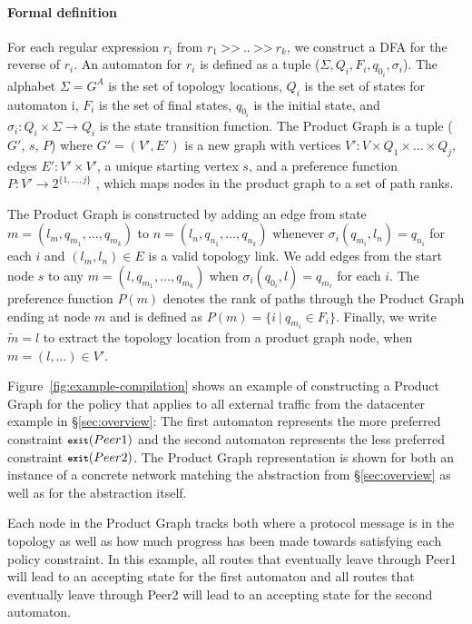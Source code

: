\documentclass{sig-alternate-10pt}
\newcommand{\para}[1]{\paragraph*{\textbf{#1}}}
\newcommand{\set}[1]{\ensuremath{\{ #1 \} }}
\newcommand{\CD}[1]{\texttt{\small #1}}  %
\newcommand{\KW}[1]{\texttt{\small\bfseries{#1}}}
\newcommand{\True}{\CD{true}}
\newcommand{\Prefer}{\texttt{>>}}
\newcommand{\Path}{\texttt{=>}}
\newcommand{\Exit}{\KW{exit}}
\begin{document}
\para{Formal definition}

For each regular expression $r_i$ from $r_1 ~\Prefer~ .. ~\Prefer~ r_k$, we construct a DFA for the reverse of $r_i$. An automaton for $r_i$ is defined as a tuple ($\Sigma, Q_i, F_i, q_{0_i}, \sigma_i$). The alphabet $\Sigma = G^A$ is the set of topology locations, $Q_i$ is the set of states for automaton i, $F_i$ is the set of final states, $q_{0_i}$ is the initial state, and $\sigma_i \colon Q_i \times \Sigma \rightarrow Q_i$ is the state transition function.
%
The Product Graph is a tuple ($G'$, $s$, $P$) where $G' = (V',E')$ is a new graph with 
vertices $V' \colon V \times Q_1 \times \dots \times Q_j$,
edges $E' \colon V' \times V'$,
a unique starting vertex $s$,
and a preference function $P \colon V' \rightarrow 2^{\set{1, \dots, j}}$ , which maps nodes in the product graph to a set of path ranks.

The Product Graph is constructed by adding an edge from state $m = (l_m, q_{m_1}, \dots, q_{m_k})$ to $n = (l_n, q_{n_1}, \dots, q_{n_k})$ whenever $\sigma_i(q_{m_i}, l_n) = q_{n_i}$ for each $i$ and $(l_m,l_n) \in E$ is a valid topology link.
%
We add edges from the start node $s$ to any $m = (l, q_{m_1}, \dots, q_{m_k})$ when $\sigma_i(q_{0_i}, l) = q_{m_i}$ for each $i$.
%
The preference function $P(m)$ denotes the rank of paths through the Product Graph ending at node $m$ and is defined as $P(m) = \set{i~\vert~q_{m_i} \in F_i}$.
%
Finally, we write $\tilde{m} = l$ to extract the topology location from a product graph node, when $m = (l, \dots) \in V'$.

Figure~\ref{fig:example-compilation} shows an example of constructing a Product Graph for the policy that applies to all external traffic from the datacenter example in \S\ref{sec:overview}: 
%
%
The first automaton represents the more preferred constraint $\Exit(Peer1)$ and the second automaton represents the less preferred constraint $\Exit(Peer2)$. The Product Graph representation is shown for both an instance of a concrete network matching the abstraction from \S\ref{sec:overview} as well as for the abstraction itself. 

Each node in the Product Graph tracks both where a protocol message is in the topology as well as how much progress has been made towards satisfying each policy constraint. In this example, all routes that eventually leave through Peer1 will lead to an accepting state for the first automaton and all routes that eventually leave through Peer2 will lead to an accepting state for the second automaton.
\end{document}
